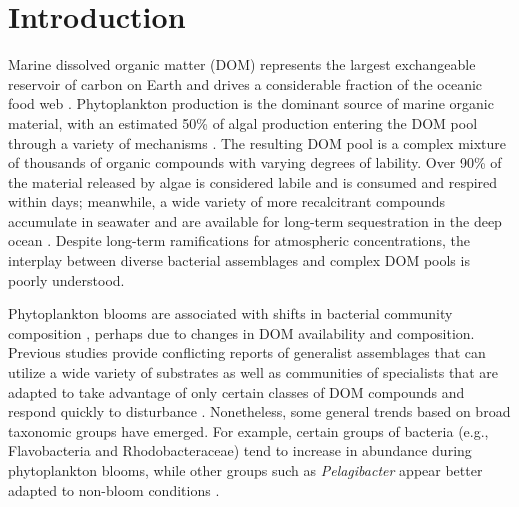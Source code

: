 \section{Introduction}

Marine dissolved organic matter (DOM) represents the largest exchangeable reservoir of carbon on Earth and drives a considerable fraction of the oceanic food web \citep{hedges1992global}. Phytoplankton production is the dominant source of marine organic material, with an estimated 50\% of algal production entering the DOM pool through a variety of mechanisms \citep{lampert1978release,fogg1983ecological,gobler1997release}. The resulting DOM pool is a complex mixture of thousands of organic compounds with varying degrees of lability. Over 90\% of the material released by algae is considered labile and is consumed and respired within days; meanwhile, a wide variety of more recalcitrant compounds accumulate in seawater and are available for long-term sequestration in the deep ocean \citep{ducklow2001seasonal}. Despite long-term ramifications for atmospheric  concentrations, the interplay between diverse bacterial assemblages and complex DOM pools is poorly understood. 

 

Phytoplankton blooms are associated with shifts in bacterial community composition \citep{Pinhassi2004-kc,Teeling2012-jz,Klindworth2014-ba}, perhaps due to changes in DOM availability and composition. Previous studies provide conflicting reports of generalist assemblages that can utilize a wide variety of substrates \citep{mou2007bacterioplankton,newton2010genome,chronopoulou2015generalist} as well as communities of specialists that are adapted to take advantage of only certain classes of DOM compounds and respond quickly to disturbance \citep{cottrell2000natural,am08,nelson2012tracking,sarmento2012use,Klindworth2014-ba,sharma2014distinct}. Nonetheless, some general trends based on broad taxonomic groups have emerged. For example, certain groups of bacteria (e.g., Flavobacteria and Rhodobacteraceae) tend to increase in abundance during phytoplankton blooms, while other groups such as \emph{Pelagibacter} appear better adapted to non-bloom conditions \citep{williams2013role,Buchan2014-yh,Voget2015-ch}. 

 

